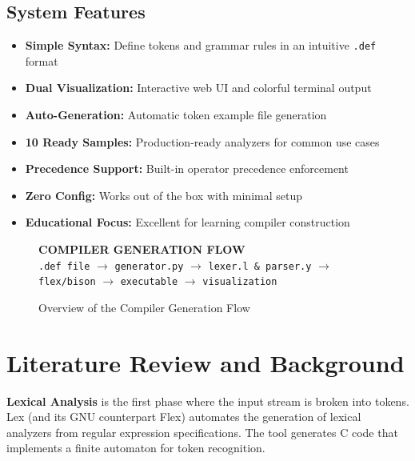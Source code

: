 \documentclass[a4paper,12pt]{report}
\begin{document}
\section{System Features}
\begin{itemize}
    \item \textbf{Simple Syntax:} Define tokens and grammar rules in an intuitive \texttt{.def} format
    \item \textbf{Dual Visualization:} Interactive web UI and colorful terminal output
    \item \textbf{Auto-Generation:} Automatic token example file generation
    \item \textbf{10 Ready Samples:} Production-ready analyzers for common use cases
    \item \textbf{Precedence Support:} Built-in operator precedence enforcement
    \item \textbf{Zero Config:} Works out of the box with minimal setup
    \item \textbf{Educational Focus:} Excellent for learning compiler construction
\end{itemize}

\begin{figure}[H]
    \centering
    \begin{tcolorbox}[colback=blue!5, colframe=blue!40, width=0.9\textwidth, height=8cm]
        \centering
        \vfill
        \textbf{COMPILER GENERATION FLOW}\\[1cm]
        \texttt{.def file} $\rightarrow$ \texttt{generator.py} $\rightarrow$ \texttt{lexer.l \& parser.y} $\rightarrow$ \texttt{flex/bison} $\rightarrow$ \texttt{executable} $\rightarrow$ \texttt{visualization}
        \vfill
    \end{tcolorbox}
    \caption{Overview of the Compiler Generation Flow}
    \label{fig:compiler_flow}
\end{figure}

\newpage

\chapter{Literature Review and Background}
\thispagestyle{contentpages}
\justifying


\textbf{Lexical Analysis} is the first phase where the input stream is broken into tokens. Lex (and its GNU counterpart Flex) automates the generation of lexical analyzers from regular expression specifications. The tool generates C code that implements a finite automaton for token recognition.
\end{document}
